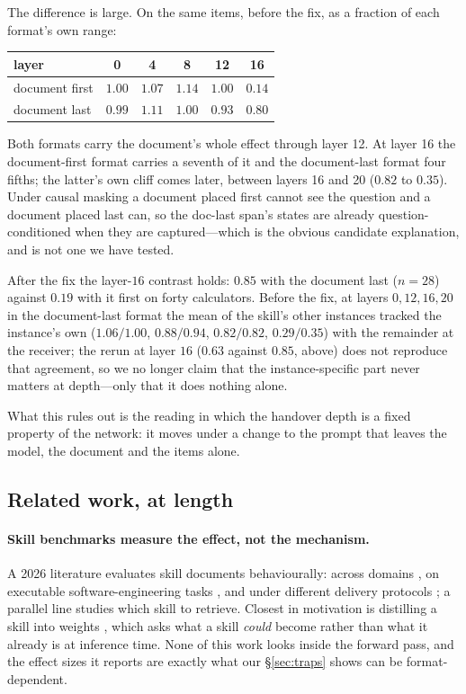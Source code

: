 \documentclass{article}
\begin{document}
The difference is large. On the same items, before the fix, as a fraction of
each format's own range:
\begin{center}
\begin{tabular}{@{}lccccc@{}}
\toprule
layer & 0 & 4 & 8 & 12 & \textbf{16} \\
\midrule
document first & $1.00$ & $1.07$ & $1.14$ & $1.00$ & $\mathbf{0.14}$ \\
document last  & $0.99$ & $1.11$ & $1.00$ & $0.93$ & $\mathbf{0.80}$ \\
\bottomrule
\end{tabular}
\end{center}

Both formats carry the document's whole effect through layer 12. At layer 16 the
document-first format carries a seventh of it and the document-last format four
fifths; the latter's own cliff comes later, between layers 16 and 20 ($0.82$ to
$0.35$). Under causal masking a document placed first cannot see the question
and a document placed last can, so the doc-last span's states are already
question-conditioned when they are captured---which is the obvious candidate
explanation, and is not one we have tested.

After the fix the layer-$16$ contrast holds: $0.85$ with the document last
($n=28$) against $0.19$ with it first on forty calculators. Before the fix, at
layers $0, 12, 16, 20$ in the document-last format the mean of the skill's other
instances tracked the instance's own ($1.06/1.00$, $0.88/0.94$, $0.82/0.82$,
$0.29/0.35$) with the remainder at the receiver; the rerun at layer $16$
($0.63$ against $0.85$, above) does not reproduce that agreement, so we no longer
claim that the instance-specific part never matters at depth---only that it does
nothing alone.

What this rules out is the reading in which the handover depth is a fixed
property of the network: it moves under a change to the prompt that leaves the
model, the document and the items alone.


\subsection{Related work, at length}
\label{app:related}

\paragraph{Skill benchmarks measure the effect, not the mechanism.}
A 2026 literature evaluates skill documents behaviourally: across domains
\citep{skillsbench2026}, on executable software-engineering tasks
\citep{sweskills2026}, and under different delivery protocols
\citep{skillsinjector2026}; a parallel line studies which skill to retrieve.
Closest in motivation is distilling a skill into weights
\citep{skilltolora2026}, which asks what a skill \emph{could} become rather
than what it already is at inference time. None of this work looks inside the
forward pass, and the effect sizes it reports are exactly what our
\S\ref{sec:traps} shows can be format-dependent.
\end{document}
